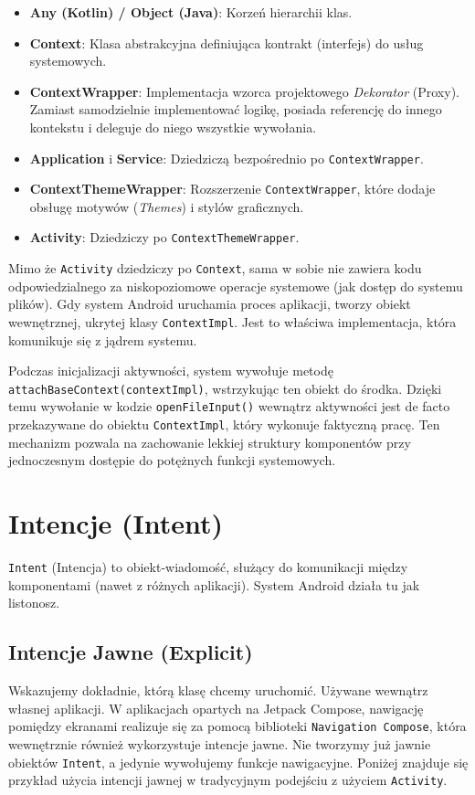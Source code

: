\begin{itemize}
    \item \textbf{Any (Kotlin) / Object (Java)}: Korzeń hierarchii klas.
    \item \textbf{Context}: Klasa abstrakcyjna definiująca kontrakt (interfejs) do usług systemowych.
    \item \textbf{ContextWrapper}: Implementacja wzorca projektowego \textit{Dekorator} (Proxy). Zamiast samodzielnie implementować logikę, posiada referencję do innego kontekstu i deleguje do niego wszystkie wywołania.
    \item \textbf{Application} i \textbf{Service}: Dziedziczą bezpośrednio po \texttt{ContextWrapper}.
    \item \textbf{ContextThemeWrapper}: Rozszerzenie \texttt{ContextWrapper}, które dodaje obsługę motywów (\textit{Themes}) i stylów graficznych.
    \item \textbf{Activity}: Dziedziczy po \texttt{ContextThemeWrapper}.
\end{itemize}

Mimo że \texttt{Activity} dziedziczy po \texttt{Context}, sama w sobie nie zawiera kodu odpowiedzialnego za niskopoziomowe operacje systemowe (jak dostęp do systemu plików). Gdy system Android uruchamia proces aplikacji, tworzy obiekt wewnętrznej, ukrytej klasy \texttt{ContextImpl}. Jest to właściwa implementacja, która komunikuje się z jądrem systemu.

Podczas inicjalizacji aktywności, system wywołuje metodę \texttt{attachBaseContext(contextImpl)}, wstrzykując ten obiekt do środka. Dzięki temu wywołanie w kodzie \texttt{openFileInput()} wewnątrz aktywności jest de facto przekazywane do obiektu \texttt{ContextImpl}, który wykonuje faktyczną pracę. Ten mechanizm pozwala na zachowanie lekkiej struktury komponentów przy jednoczesnym dostępie do potężnych funkcji systemowych.

\section{Intencje (Intent)}

\texttt{Intent} (Intencja) to obiekt-wiadomość, służący do komunikacji między komponentami (nawet z różnych aplikacji). System Android działa tu jak listonosz.

\subsection{Intencje Jawne (Explicit)}
Wskazujemy dokładnie, którą klasę chcemy uruchomić. Używane wewnątrz własnej aplikacji. W aplikacjach opartych na Jetpack Compose, nawigację pomiędzy ekranami realizuje się za pomocą biblioteki \texttt{Navigation Compose}, która wewnętrznie również wykorzystuje intencje jawne. Nie tworzymy już jawnie obiektów \texttt{Intent}, a jedynie wywołujemy funkcje nawigacyjne. Poniżej znajduje się przykład użycia intencji jawnej w tradycyjnym podejściu z użyciem \texttt{Activity}.


